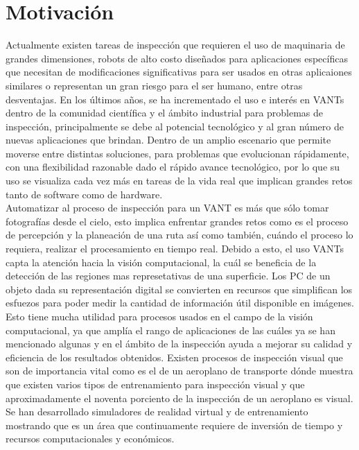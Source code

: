 \documentclass[]{report}
\begin{document}
\section{Motivación}
Actualmente existen tareas de inspección que requieren el uso de maquinaria de grandes dimensiones, robots de alto costo diseñados para aplicaciones específicas que necesitan de modificaciones significativas para ser usados en otras aplicaiones similares o representan un gran riesgo para el ser humano, entre otras desventajas. En los últimos años, se ha incrementado el uso e interés en VANTs dentro de la comunidad científica y el ámbito industrial para problemas de inspección, principalmente se debe al potencial tecnológico y al gran número de nuevas aplicaciones que brindan.  Dentro de un amplio escenario que permite moverse entre distintas soluciones, para problemas que evolucionan rápidamente, con una flexibilidad razonable dado el rápido avance tecnológico, por lo que su uso se visualiza cada vez más en tareas de la vida real que implican grandes retos tanto de software como de hardware. \\
Automatizar al proceso de inspección para un VANT es más que sólo tomar fotografías desde el cielo, esto implica enfrentar grandes retos como es el proceso de percepción y la planeación de una ruta así como también, cuándo el proceso lo requiera, realizar el procesamiento en tiempo real.
Debido a esto, el uso VANTs capta la atención hacia la visión computacional, la cuál se beneficia de la detección de las regiones mas represetativas de una superficie.
Los PC de un objeto dada su representación digital se convierten en recursos que simplifican los esfuezos para poder medir la cantidad de información útil disponible en imágenes. Esto tiene mucha utilidad para procesos usados en el campo de la visión computacional, ya que amplía el rango de aplicaciones de las cuáles ya se han mencionado algunas y en el ámbito de la inspección ayuda a mejorar su calidad y eficiencia de los resultados obtenidos.
Existen procesos de inspección visual que son de importancia vital como es el de un aeroplano de transporte \cite{sadasivan2005use} dónde muestra que existen varios tipos de entrenamiento para inspección visual y que aproximadamente el noventa porciento de la inspección de un aeroplano es visual. Se han desarrollado simuladores de realidad virtual \cite{sadasivan2005use} y de entrenamiento \cite{gramopadhye2001use} mostrando que es un área que continuamente requiere de inversión de tiempo y recursos computacionales y económicos.\\
\end{document}

